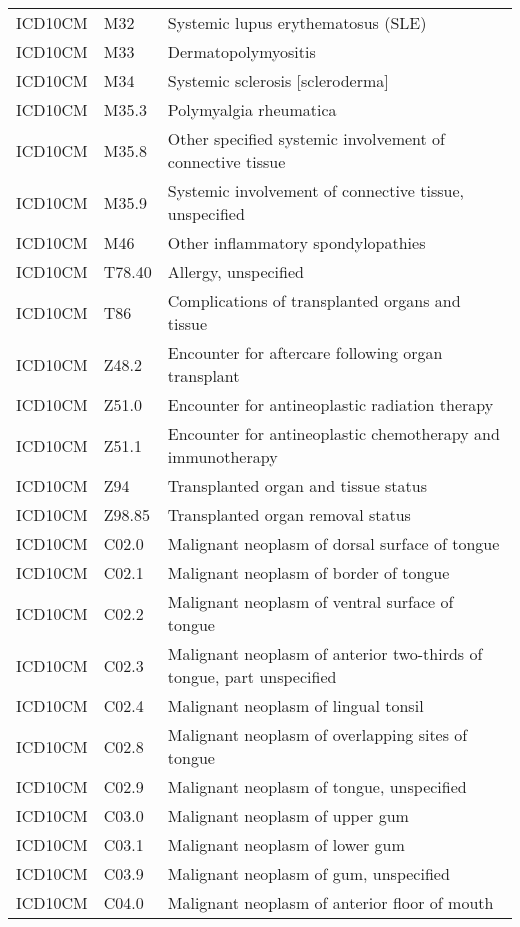 \begin{table}[ht]
\begin{tabular}{lll}
  ICD10CM & M32 & Systemic lupus erythematosus (SLE) \\ 
  ICD10CM & M33 & Dermatopolymyositis \\ 
  ICD10CM & M34 & Systemic sclerosis [scleroderma] \\ 
  ICD10CM & M35.3 & Polymyalgia rheumatica \\ 
  ICD10CM & M35.8 & Other specified systemic involvement of connective tissue \\ 
  ICD10CM & M35.9 & Systemic involvement of connective tissue, unspecified \\ 
  ICD10CM & M46 & Other inflammatory spondylopathies \\ 
  ICD10CM & T78.40 & Allergy, unspecified \\ 
  ICD10CM & T86 & Complications of transplanted organs and tissue \\ 
  ICD10CM & Z48.2 & Encounter for aftercare following organ transplant \\ 
  ICD10CM & Z51.0 & Encounter for antineoplastic radiation therapy \\ 
  ICD10CM & Z51.1 & Encounter for antineoplastic chemotherapy and immunotherapy \\ 
  ICD10CM & Z94 & Transplanted organ and tissue status \\ 
  ICD10CM & Z98.85 & Transplanted organ removal status \\ 
  ICD10CM & C02.0 & Malignant neoplasm of dorsal surface of tongue \\ 
  ICD10CM & C02.1 & Malignant neoplasm of border of tongue \\ 
  ICD10CM & C02.2 & Malignant neoplasm of ventral surface of tongue \\ 
  ICD10CM & C02.3 & Malignant neoplasm of anterior two-thirds of tongue, part unspecified \\ 
  ICD10CM & C02.4 & Malignant neoplasm of lingual tonsil \\ 
  ICD10CM & C02.8 & Malignant neoplasm of overlapping sites of tongue \\ 
  ICD10CM & C02.9 & Malignant neoplasm of tongue, unspecified \\ 
  ICD10CM & C03.0 & Malignant neoplasm of upper gum \\ 
  ICD10CM & C03.1 & Malignant neoplasm of lower gum \\ 
  ICD10CM & C03.9 & Malignant neoplasm of gum, unspecified \\ 
  ICD10CM & C04.0 & Malignant neoplasm of anterior floor of mouth \\ 

\end{tabular}
\end{table}
